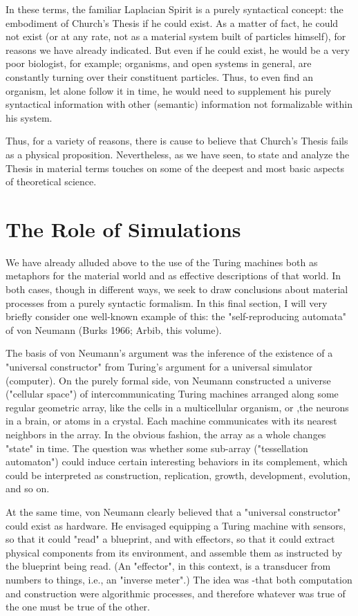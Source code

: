 \documentclass[a4paper,12pt]{article}
\begin{document}
In these terms, the familiar Laplacian Spirit is a purely syntactical concept: the embodiment of Church's Thesis if he could exist.  As a matter
of fact, he could not exist (or at any rate, not as a material system built of particles himself), for reasons we have already indicated.
But even if he could exist, he would be a very poor biologist, for example; organisms, and open systems in general, are constantly turning over their
constituent particles. Thus, to even find an organism, let alone follow it in time, he would need to supplement his purely syntactical
information with other (semantic) information not formalizable within his system.

Thus, for a variety of reasons, there is cause to believe that Church's Thesis fails as a physical proposition. Nevertheless,
as we have seen, to state and analyze the Thesis in material terms touches on some of the deepest and most basic aspects of theoretical science.

\section{The Role of Simulations}

We have already alluded above to the use of the Turing machines both
as metaphors for the material world and as effective descriptions of that
world.  In both cases, though in different ways, we seek to draw conclusions
about material processes from a purely syntactic formalism. In this final section,
I will very briefly consider one well-known example of this:
the "self-reproducing automata" of von Neumann (Burks 1966; Arbib, this volume).

The basis of von Neumann's argument was the inference of the existence of a "universal constructor" from Turing's
argument for a universal simulator (computer).  On the purely formal side, von Neumann constructed
a universe ("cellular space") of intercommunicating Turing machines arranged along some regular geometric array,
like the cells in a multicellular organism, or ,the neurons in a brain, or atoms in a crystal. Each machine
communicates with its nearest neighbors in the array. In the obvious fashion, the array as a whole changes "state" in time.
The question was whether some sub-array ("tessellation automaton") could induce certain interesting behaviors in its complement,
which could be interpreted as construction, replication, growth, development, evolution, and so on.

At the same time, von Neumann clearly believed that a "universal constructor" could exist as hardware. He envisaged equipping a Turing machine
with sensors, so that it could "read" a blueprint, and with effectors,
so that it could extract physical components from its environment, and
assemble them as instructed by the blueprint being read. (An "effector",
in this context, is a transducer from numbers to things, i.e., an "inverse
meter".) The idea was -that both computation and construction were algorithmic processes,
and therefore whatever was true of the one must be true
of the other.
\end{document}
